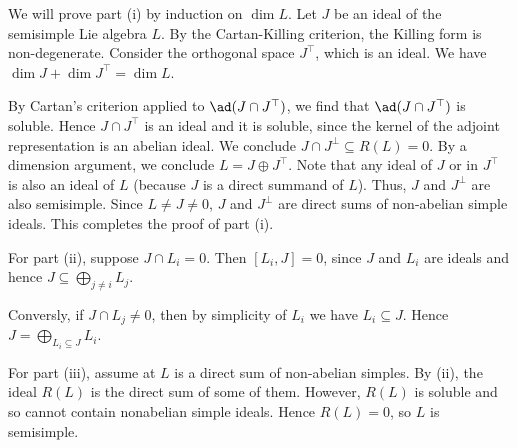 We will prove part (i) by induction on $\dim L$. Let $J$ be an ideal of
the semisimple Lie algebra $L$. By the Cartan-Killing criterion, the Killing
form is non-degenerate. Consider the orthogonal space $J^\top$, which is an
ideal. We have $\dim J + \dim J^\top = \dim L$.

By Cartan's criterion applied to $\ad(J\cap J^\top)$, we find that
$\ad(J\cap J^\top)$ is soluble. Hence $J\cap J^\top$ is an ideal and it is
soluble, since the kernel of the adjoint representation is an abelian ideal.
We conclude $J\cap J^\perp \subseteq R(L) = 0$. By a dimension argument, we
conclude $L = J\oplus J^\top$. Note that any ideal of $J$ or in $J^\top$
is also an ideal of $L$ (because $J$ is a direct summand of $L$). Thus,
$J$ and $J^\perp$ are also semisimple. Since $L\neq J \neq 0$,  $J$ and $J^\perp$
are direct sums of non-abelian simple ideals. This completes the proof of
part (i).

For part (ii), suppose $J\cap L_i = 0$. Then $[L_i, J] = 0$, since $J$ and $L_i$
are ideals and hence $J \subseteq \bigoplus_{j\neq i} L_j$.

Conversly, if $J\cap L_j \neq 0$, then by simplicity of $L_i$ we have $L_i \subseteq J$.
Hence $J = \bigoplus_{L_i \subseteq J}L_i$.

For part (iii), assume at $L$ is a direct sum of non-abelian simples. By
(ii), the ideal $R(L)$ is the direct sum of some of them. However,
$R(L)$ is soluble and so cannot contain nonabelian simple ideals. Hence
$R(L) = 0$, so $L$ is semisimple.
